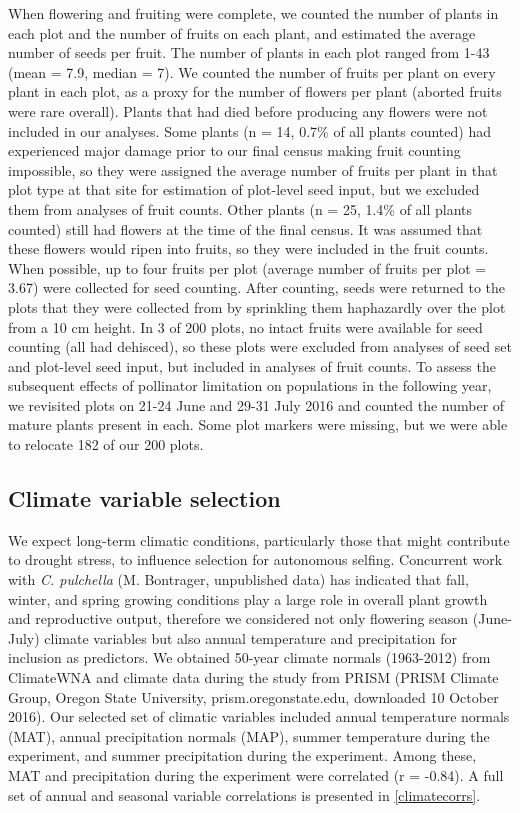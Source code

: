 \documentclass{article}
\begin{document}
When flowering and fruiting were complete, we counted the number of plants in each plot and the number of fruits on each plant, and estimated the average number of seeds per fruit. The number of plants in each plot ranged from 1-43 (mean = 7.9, median = 7). We counted the number of fruits per plant on every plant in each plot, as a proxy for the number of flowers per plant (aborted fruits were rare overall). Plants that had died before producing any flowers were not included in our analyses. Some plants (n = 14, 0.7\% of all plants counted) had experienced major damage prior to our final census making fruit counting impossible, so they were assigned the average number of fruits per plant in that plot type at that site for estimation of plot-level seed input, but we excluded them from analyses of fruit counts. Other plants (n = 25, 1.4\% of all plants counted) still had flowers at the time of the final census. It was assumed that these flowers would ripen into fruits, so they were included in the fruit counts. When possible, up to four fruits per plot (average number of fruits per plot = 3.67) were collected for seed counting. After counting, seeds were returned to the plots that they were collected from by sprinkling them haphazardly over the plot from a 10 cm height. In 3 of 200 plots, no intact fruits were available for seed counting (all had dehisced), so these plots were excluded from analyses of seed set and plot-level seed input, but included in analyses of fruit counts. To assess the subsequent effects of pollinator limitation on populations in the following year, we revisited plots on 21-24 June and 29-31 July 2016 and counted the number of mature plants present in each. Some plot markers were missing, but we were able to relocate 182 of our 200 plots.

\subsection*{Climate variable selection}

We expect long-term climatic conditions, particularly those that might contribute to drought stress, to influence selection for autonomous selfing. Concurrent work with \textit{C. pulchella} (M. Bontrager, unpublished data) has indicated that fall, winter, and spring growing conditions play a large role in overall plant growth and reproductive output, therefore we considered not only flowering season (June-July) climate variables but also annual temperature and precipitation for inclusion as predictors. We obtained 50-year climate normals (1963-2012) from ClimateWNA \citep{wang2012climatewna} and climate data during the study from PRISM (PRISM Climate Group, Oregon State University, prism.oregonstate.edu, downloaded 10 October 2016). Our selected set of climatic variables included annual temperature normals (MAT), annual precipitation normals (MAP), summer temperature during the experiment, and summer precipitation during the experiment. Among these, MAT and precipitation during the experiment were correlated (r = -0.84). A full set of annual and seasonal variable correlations is presented in \autoref{climatecorrs}.
\end{document}
